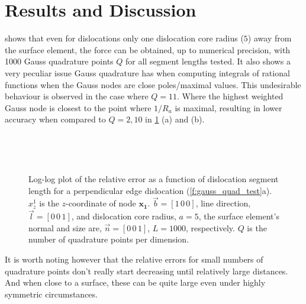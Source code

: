 \section{Results and Discussion}\label{s:paperResults}

 shows that even for dislocations only one dislocation core radius ($5$) away from the surface element, the force can be obtained, up to numerical precision, with 1000 Gauss quadrature points $Q$ for all segment lengths tested. It also shows a very peculiar issue Gauss quadrature has when computing integrals of rational functions when the Gauss nodes are close poles/maximal values. This undesirable behaviour is observed in the case where $Q = 11$. Where the highest weighted Gauss node is closest to the point where $1/R_{a}$ is maximal, resulting in lower accuracy when compared to $Q = 2, 10$ in \cref{f:rel_err_perp_edge} (a) and (b).
\begin{figure}
    \centering
    ~

    ~
    \caption[Relative error for an edge dislocation perpendicular to a surface element.]{Log-log plot of the relative error as a function of dislocation segment length for a perpendicular edge dislocation (\cref{f:gauss_quad_test}a). $x^{1}_{z}$ is the $z$-coordinate of node $\mathbf{x_1}$. $\vec{b} = [1\, 0\, 0]$, line direction, $\vec{l} = [0\, 0\, 1]$, and dislocation core radius, $a = 5$, the surface element's normal and size are, $\vec{n} = [0\, 0\, 1]$, $L = 1000$, respectively. $Q$ is the number of quadrature points per dimension.}
    \label{f:rel_err_perp_edge}
\end{figure}
It is worth noting however that the relative errors for small numbers of quadrature points don't really start decreasing until relatively large distances. And when close to a surface, these can be quite large even under highly symmetric circumstances.

